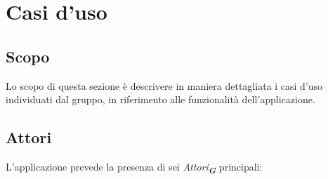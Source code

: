 

\section{Casi d'uso}
\label{sec:casi_uso}

\subsection{Scopo}

Lo scopo di questa sezione è descrivere in maniera dettagliata i casi d’uso individuati dal
gruppo, in riferimento alle funzionalità dell’applicazione.


\subsection{Attori}
\label{sec:attori}

L’applicazione prevede la presenza di sei \emph{Attori}\textsubscript{\textbf{\textit{G}}} principali:

